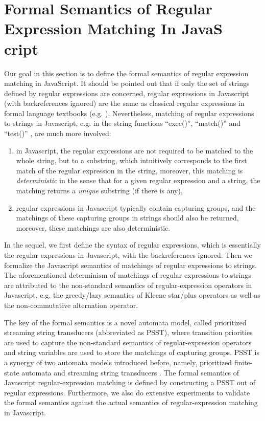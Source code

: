 
\section{Formal Semantics of Regular Expression Matching In JavaS cript}\label{sec-rwre}
Our goal in this section is to define the formal semantics of regular expression matching in JavaScript. 
%
It should be pointed out that if only the set of strings defined by regular expressions are concerned, regular expressions in Javascript (with backreferences ignored) are the same as classical regular expressions in formal language textbooks (e.g. \cite{HU79}). Nevertheless, matching of regular expressions to strings in Javascript, e.g. in the string functions ``exec()'', ``match()'' and ``test()'' , are much more involved: 
\begin{enumerate}
\item in Javascript, the regular expressions are not required to be matched to the whole string, but to a substring, which intuitively corresponds to the first match of the regular expression in the string, moreover, this matching is \emph{deterministic} in the sense that for a given regular expression and a string, the matching returns a \emph{unique} substring (if there is any), 
%
\item regular expressions in Javascript typically contain capturing groups, and the matchings of these capturing groups in strings should also be returned, moreover, these matchings are also deterministic.
\end{enumerate}

In the sequel, we first define the syntax of regular expressions, which is essentially the regular expressions in Javascript, with the backreferences ignored. 
%
Then we formalize the Javascript semantics of matchings of regular expressions to strings. The aforementioned determinism of matchings of regular expressions to strings are attributed to the non-standard semantics of regular-expression operators in Javascript, e.g. the greedy/lazy semantics of Kleene star/plus operators as well as the non-commutative alternation operator.  

The key of the formal semantics is a novel automata model, called prioritized streaming string transducers (abbreviated as PSST), where transition priorities are used to capture the non-standard semantics of regular-expression operators and string variables are used to store the matchings of capturing groups. PSST is a synergy of two automata models introduced before, namely, prioritized finite-state automata \cite{BM17} and streaming string transducers \cite{AC10,AD11}. The formal semantics of Javascript regular-expression matching is defined by constructing a PSST out of regular expressions. 
%
Furthermore, we also do extensive experiments to validate the formal semantics against the actual semantics of regular-expression matching in Javascript.


